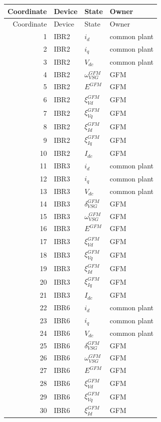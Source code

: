 \begin{longtable}{@{}r l l l@{}}
\toprule
Coordinate & Device & State & Owner \\ \midrule
\endfirsthead
\toprule
Coordinate & Device & State & Owner \\ \midrule
\endhead
1 & IBR2 & $i_d$ & common plant \\ 
2 & IBR2 & $i_q$ & common plant \\ 
3 & IBR2 & $V_{dc}$ & common plant \\ 
4 & IBR2 & $\omega_{VSG}^{GFM}$ & GFM \\ 
5 & IBR2 & $E^{GFM}$ & GFM \\ 
6 & IBR2 & $\xi_{Vd}^{GFM}$ & GFM \\ 
7 & IBR2 & $\xi_{Vq}^{GFM}$ & GFM \\ 
8 & IBR2 & $\xi_{Id}^{GFM}$ & GFM \\ 
9 & IBR2 & $\xi_{Iq}^{GFM}$ & GFM \\ 
10 & IBR2 & $I_{dc}$ & GFM \\ 
11 & IBR3 & $i_d$ & common plant \\ 
12 & IBR3 & $i_q$ & common plant \\ 
13 & IBR3 & $V_{dc}$ & common plant \\ 
14 & IBR3 & $\delta_{VSG}^{GFM}$ & GFM \\ 
15 & IBR3 & $\omega_{VSG}^{GFM}$ & GFM \\ 
16 & IBR3 & $E^{GFM}$ & GFM \\ 
17 & IBR3 & $\xi_{Vd}^{GFM}$ & GFM \\ 
18 & IBR3 & $\xi_{Vq}^{GFM}$ & GFM \\ 
19 & IBR3 & $\xi_{Id}^{GFM}$ & GFM \\ 
20 & IBR3 & $\xi_{Iq}^{GFM}$ & GFM \\ 
21 & IBR3 & $I_{dc}$ & GFM \\ 
22 & IBR6 & $i_d$ & common plant \\ 
23 & IBR6 & $i_q$ & common plant \\ 
24 & IBR6 & $V_{dc}$ & common plant \\ 
25 & IBR6 & $\delta_{VSG}^{GFM}$ & GFM \\ 
26 & IBR6 & $\omega_{VSG}^{GFM}$ & GFM \\ 
27 & IBR6 & $E^{GFM}$ & GFM \\ 
28 & IBR6 & $\xi_{Vd}^{GFM}$ & GFM \\ 
29 & IBR6 & $\xi_{Vq}^{GFM}$ & GFM \\ 
30 & IBR6 & $\xi_{Id}^{GFM}$ & GFM \\ 

\end{longtable}
